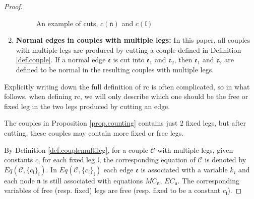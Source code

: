 \begin{proof}
\begin{defn}
\begin{enumerate}
\begin{figure}[H]
{
    }
        \caption{An example of cuts, $c(\mathfrak{n})$ and $c(\mathfrak{l})$}
        \label{fig.c(n)c(e)}
    \end{figure}
    \item \textbf{Normal edges in couples with multiple legs:} In this paper, all couples with multiple legs are produced by cutting a couple defined in Definition \ref{def.conple}. If a normal edge $\mathfrak{e}$ is cut into $\mathfrak{e}_1$ and $\mathfrak{e}_2$, then $\mathfrak{e}_1$ and $\mathfrak{e}_2$ are defined to be normal in the resulting couples with multiple legs.
\end{enumerate}
\end{defn}
\begin{rem}
Explicitly writing down the full definition of $\text{rc}$ is often complicated, so in what follows, when defining $\text{rc}$, we will only describe which one should be the free or fixed leg in the two legs produced by cutting an edge.
\end{rem}

The couples in Proposition \ref{prop.counting} contains just $2$ fixed legs, but after cutting, these couples may contain more fixed or free legs. 

By Definition \ref{def.couplemultileg}, for a couple $\mathcal{C}$ with multiple legs, given constants $c_{\mathfrak{l}}$ for each fixed leg $\mathfrak{l}$, the corresponding equation of $\mathcal{C}$ is denoted by $Eq(\mathcal{C},\{c_{\mathfrak{l}}\}_{\mathfrak{l}})$.
In $Eq(\mathcal{C},\{c_{\mathfrak{l}}\}_{\mathfrak{l}})$ each edge $\mathfrak{e}$ is associated with a variable $k_{\mathfrak{e}}$ and each node $\mathfrak{n}$ is still associated with equations $MC_{\mathfrak{n}}$, $EC_{\mathfrak{n}}$. The corresponding variables of free (resp. fixed) legs are free (resp. fixed to be a constant $c_{\mathfrak{l}}$).



\end{proof}
